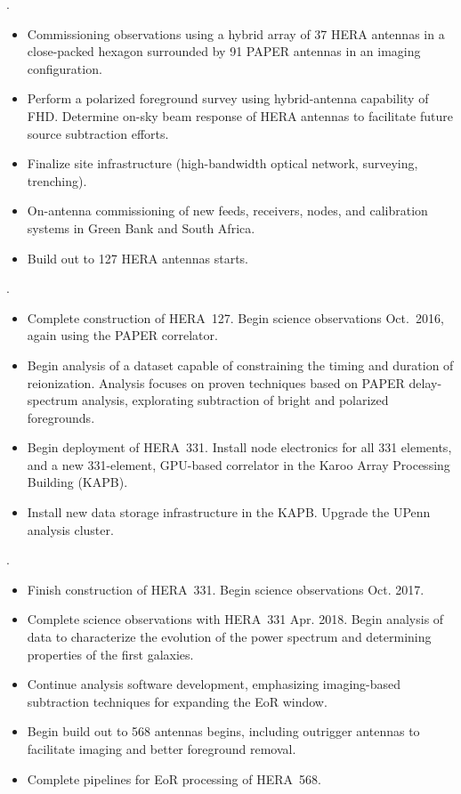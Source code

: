 \documentclass[preprint]{aastex}
\begin{document}
.  
\begin{itemize}\setlength{\parskip}{0pt}\itemsep0pt
\vspace{-7pt}
  \item Commissioning observations using a hybrid array of 37 HERA antennas in a close-packed hexagon surrounded by 91 PAPER antennas in an imaging configuration.
  \item Perform a polarized foreground survey using hybrid-antenna capability of FHD. Determine on-sky beam response of HERA antennas to facilitate future source subtraction efforts.
  \item Finalize site infrastructure (high-bandwidth optical network, surveying, trenching).
  \item On-antenna commissioning of new feeds, receivers, nodes, and calibration systems in Green Bank and South Africa.
  \item Build out to 127 HERA antennas starts.
\end{itemize}


.
\begin{itemize}\setlength{\parskip}{0pt}\itemsep0pt
\vspace{-7pt}
  \item Complete construction of HERA~127. Begin science observations Oct.\ 2016, again using the PAPER correlator.
  \item Begin analysis of a dataset capable of constraining the timing and duration of reionization. 
Analysis focuses on proven techniques based on PAPER delay-spectrum analysis, explorating subtraction of bright 
and polarized foregrounds.
  \item Begin deployment of HERA~331. Install node electronics for all 331 elements, and a new 331-element, 
GPU-based correlator in the Karoo Array Processing Building (KAPB).
  \item  Install new data storage infrastructure in the KAPB.  
Upgrade the UPenn analysis cluster.
\end{itemize}

.
\begin{itemize}\setlength{\parskip}{0pt}\itemsep0pt
\vspace{-7pt}
  \item Finish construction of HERA~331. Begin science observations Oct. 2017.
  \item Complete science observations with HERA~331 Apr. 2018. Begin analysis of data to
characterize the evolution of the power spectrum and determining properties of the first galaxies.
  \item Continue analysis software development, emphasizing imaging-based subtraction techniques for expanding the EoR window.
  \item Begin build out to 568 antennas begins, including outrigger antennas to facilitate imaging and better foreground removal.
  \item Complete pipelines for EoR processing of HERA~568.
\end{itemize}
\end{document}

